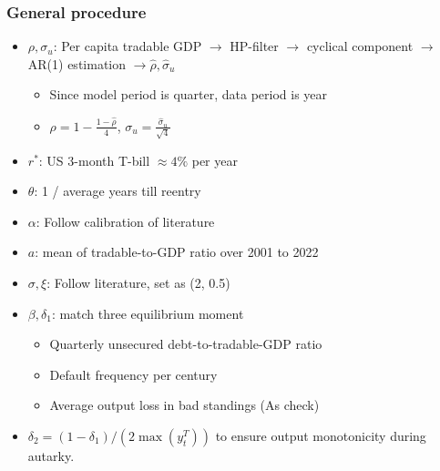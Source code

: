 \documentclass[mathserif]{beamer}
\begin{document}
   \begin{frame}
    \frametitle{General procedure}
    \begin{itemize}
        \item $\rho, \sigma_u$:  Per capita tradable GDP $\rightarrow$ HP-filter $\rightarrow$ cyclical component $\rightarrow$ AR(1) estimation $\rightarrow \hat{\rho}, \hat{\sigma}_u$
        \begin{itemize}
            \item Since model period is quarter, data period is year
            \item $\rho = 1 - \frac{1 - \hat{\rho}}{4}$, $\sigma_u = \frac{\hat{\sigma}_u}{\sqrt{4}}$
        \end{itemize}
        \item $r^*$: US 3-month T-bill $\approx 4\%$ per year
        \item $\theta$: 1 / average years till reentry
        \item $\alpha$: Follow calibration of literature
        \item $a$: mean of tradable-to-GDP ratio over 2001 to 2022
        \item $\sigma, \xi$: Follow literature, set as (2, 0.5)
        \item $\beta, \delta_1$: match three equilibrium moment
        \begin{itemize}
            \item Quarterly unsecured debt-to-tradable-GDP ratio
            \item Default frequency per century
            \item Average output loss in bad standings (As check)
        \end{itemize}
        \item $\delta_2 = (1 - \delta_1) / (2\max(y^T_t))$ to ensure output monotonicity during autarky.
    \end{itemize}
   \end{frame}
\end{document}
